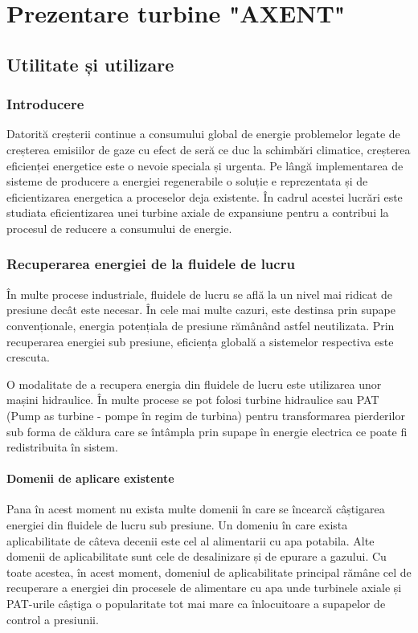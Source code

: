 \chapter{Prezentare turbine "AXENT"}\label{chapter:prezentare}


\section{Utilitate și utilizare}

\subsection{Introducere}

Datorită creșterii continue a consumului global de energie problemelor legate de creșterea emisiilor de gaze cu efect de seră ce duc la schimbări climatice, creșterea eficienței energetice este o nevoie speciala  și urgenta. Pe lângă implementarea de sisteme de producere a energiei regenerabile o soluție e reprezentata și de eficientizarea energetica a proceselor deja existente. În cadrul acestei lucrări este studiata eficientizarea unei turbine axiale de expansiune pentru a contribui la procesul de reducere a consumului de energie.


\subsection{Recuperarea energiei de la fluidele de lucru}

În multe procese industriale, fluidele de lucru se află la un nivel mai ridicat de presiune decât este necesar. În cele mai multe cazuri, este destinsa prin supape convenționale, energia potențiala de presiune rămânând astfel neutilizata. Prin recuperarea energiei sub presiune, eficiența globală a sistemelor respectiva este crescuta.

O modalitate de a recupera energia din fluidele de lucru este utilizarea unor mașini hidraulice. În multe procese se pot folosi turbine hidraulice sau PAT (Pump as turbine - pompe în regim de turbina) pentru transformarea pierderilor sub forma de căldura care se întâmpla prin supape în energie electrica ce poate fi redistribuita în sistem.


\subsubsection{Domenii de aplicare existente}

Pana în acest moment nu exista multe domenii în care se încearcă câștigarea energiei din fluidele de lucru sub presiune. Un domeniu în care exista aplicabilitate de câteva decenii este cel al alimentarii cu apa potabila. Alte domenii de aplicabilitate sunt cele de desalinizare și de epurare a gazului. Cu toate acestea, în acest moment, domeniul de aplicabilitate principal rămâne cel de recuperare a energiei din procesele de alimentare cu apa unde turbinele axiale și PAT-urile câștiga o popularitate tot mai mare ca înlocuitoare a supapelor de control a presiunii.

